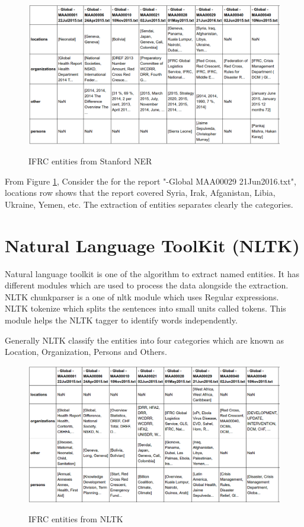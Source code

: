 \begin{figure}[hbtp]
\caption{IFRC entities from Stanford NER}
\centering\includegraphics[scale =.45]{images/stanford.png} \label{stanford}
\end{figure}
From Figure \ref{stanford},  Consider the for the report "-Global MAA00029 21Jun2016.txt", locations row  shows that the report covered Syria, Irak, Afganistan, Libia, Ukraine, Yemen, etc.
The extraction of entities separates clearly the categories.
\section{Natural Language ToolKit (NLTK)}
Natural language toolkit is one of the algorithm to extract named  entities. It has different modules which are used to process the data alongside the extraction.
NLTK chunkparser is a one of nltk module  which uses Regular expressions. NLTK tokenize which splits the sentences into small units called tokens. This module helps the NLTK tagger to identify words independently. 

Generally NLTK classify the entities into four categories which are known as Location, Organization, Persons and Others.
\newpage

\begin{figure}[hbtp]
\caption{IFRC entities from NLTK}
\centering
\includegraphics[scale=.45]{images/nltkalgo.png}\label{nltkalgo}
\end{figure}

